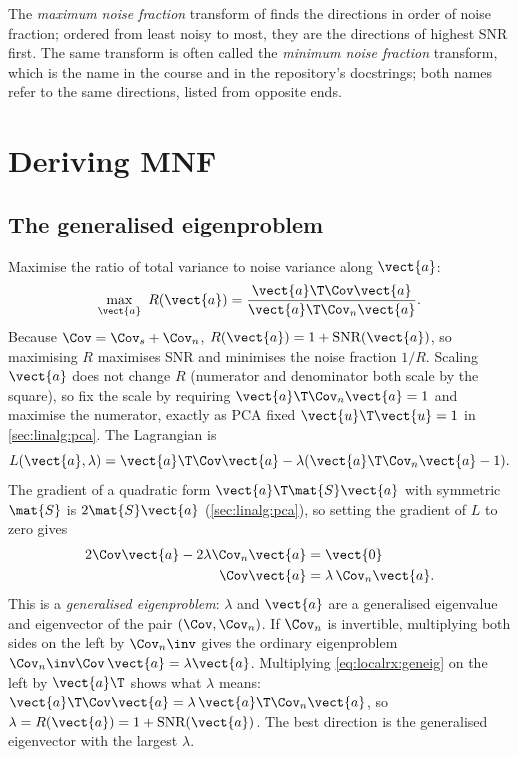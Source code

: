 The \emph{maximum noise fraction} transform of \citet{green1988transformation}
finds the directions in order of noise fraction; ordered from least noisy to most, they are the
directions of highest SNR first. The same transform is often called the \emph{minimum noise fraction}
transform, which is the name in the course and in the repository's docstrings; both names refer to the
same directions, listed from opposite ends.

\section{Deriving MNF}\label{sec:localrx:mnf}

\subsection{The generalised eigenproblem}

Maximise the ratio of total variance to noise variance along $\vect{a}$:
\begin{equation}\label{eq:localrx:rayleigh}
\max_{\vect{a}}\ R(\vect{a}) = \frac{\vect{a}\T\Cov\vect{a}}{\vect{a}\T\Cov_n\vect{a}} .
\end{equation}
Because $\Cov = \Cov_s + \Cov_n$, $R(\vect{a}) = 1 + \text{SNR}(\vect{a})$, so maximising $R$ maximises SNR
and minimises the noise fraction $1/R$. Scaling $\vect{a}$ does not change $R$ (numerator and
denominator both scale by the square), so fix the scale by requiring $\vect{a}\T\Cov_n\vect{a} = 1$ and
maximise the numerator, exactly as PCA fixed $\vect{u}\T\vect{u} = 1$ in \cref{sec:linalg:pca}. The
Lagrangian is
\[
L(\vect{a}, \lambda) = \vect{a}\T\Cov\vect{a} - \lambda(\vect{a}\T\Cov_n\vect{a} - 1).
\]
The gradient of a quadratic form $\vect{a}\T\mat{S}\vect{a}$ with symmetric $\mat{S}$ is $2\mat{S}\vect{a}$
(\cref{sec:linalg:pca}), so setting the gradient of $L$ to zero gives
\begin{align}
2\Cov\vect{a} - 2\lambda\Cov_n\vect{a} &= \vect{0} \notag\\
\Cov\vect{a} &= \lambda\,\Cov_n\vect{a} . \label{eq:localrx:geneig}
\end{align}
This is a \emph{generalised eigenproblem}: $\lambda$ and $\vect{a}$ are
a generalised eigenvalue and eigenvector of the pair $(\Cov, \Cov_n)$. If $\Cov_n$ is invertible,
multiplying both sides on the left by $\Cov_n\inv$ gives the ordinary eigenproblem
$\Cov_n\inv\Cov\,\vect{a} = \lambda\vect{a}$. Multiplying \cref{eq:localrx:geneig} on the left by
$\vect{a}\T$ shows what $\lambda$ means:
$\vect{a}\T\Cov\vect{a} = \lambda\,\vect{a}\T\Cov_n\vect{a}$, so $\lambda = R(\vect{a}) = 1 +
\text{SNR}(\vect{a})$. The best direction is the generalised eigenvector with the largest $\lambda$.

